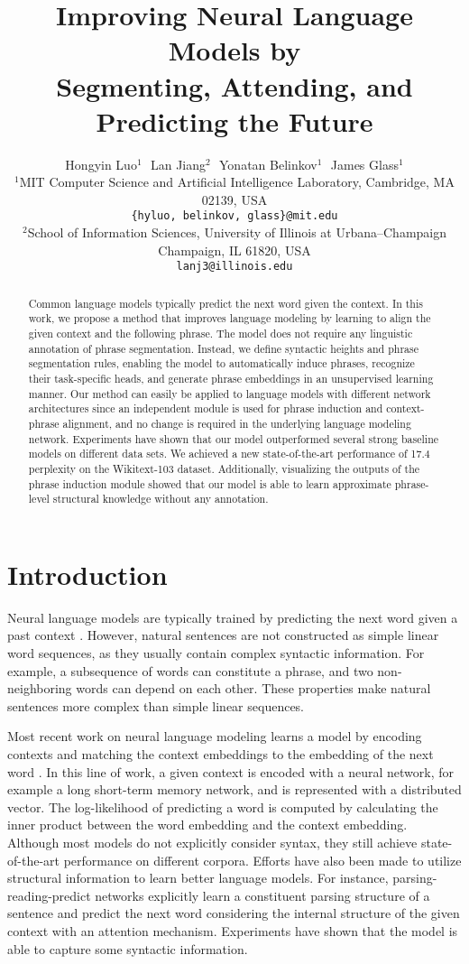 \documentclass[11pt,a4paper]{article}
\title{Improving Neural Language Models by\\ Segmenting, Attending, and Predicting the Future}
\author{Hongyin Luo$^1$ $    $ Lan Jiang$^2$ $    $ Yonatan Belinkov$^1$ $    $ James Glass$^1$ \\
  $^{1}$MIT Computer Science and Artificial Intelligence Laboratory, Cambridge, MA 02139, USA \\
  {\tt \{hyluo, belinkov, glass\}@mit.edu}\\
  $^{2}$School of Information Sciences, University of Illinois at Urbana--Champaign\\ Champaign, IL
61820, USA \\ 
  {\tt lanj3@illinois.edu}
  }
\date{}
\begin{document}
\maketitle
\begin{abstract}
Common language models typically predict the next word given the context. In this work, we propose a method that improves language modeling by learning to align the given context and the following phrase. The model does not require any linguistic annotation of phrase segmentation. Instead, we define syntactic heights and phrase segmentation rules, enabling the model to automatically induce phrases, recognize their task-specific heads, and generate phrase embeddings in an unsupervised learning manner. Our method can easily be applied to language models with different network architectures since an independent module is used for phrase induction and context-phrase alignment, and no change is required in the underlying language modeling network. Experiments have shown that our model outperformed several strong baseline models on different data sets. We achieved a new state-of-the-art performance of 17.4 perplexity on the Wikitext-103 dataset. Additionally, visualizing the outputs of the phrase induction module showed that our model is able to learn approximate phrase-level structural knowledge without any annotation.
\end{abstract}

\section{Introduction}

Neural language models
are typically trained
by predicting the next word given a past context \cite{bengio2003neural}. However, natural sentences are not constructed as simple linear word sequences, as they usually contain complex syntactic information. For example, a subsequence of words can constitute a phrase, and two non-neighboring words can depend on each other. These properties make natural sentences more complex than simple linear sequences.

Most recent work on neural language modeling learns a model by encoding contexts and matching the context embeddings to the embedding of the next word \cite{bengio2003neural,merity2017regularizing,melis2017state}. In this line of work, a given context is encoded with a neural network, for example a long short-term memory \citep[LSTM;][]{hochreiter1997long} network, and is represented with a distributed vector. The log-likelihood of predicting a word is computed by calculating the inner product between the word embedding and the context embedding. Although most models do not explicitly consider syntax, they still achieve state-of-the-art performance on different corpora. Efforts have also been made to utilize structural information to learn better language models. For instance, parsing-reading-predict networks \citep[PRPN;][]{shen2017neural} explicitly learn a constituent parsing structure of a sentence and predict the next word considering the internal structure of the given context with an attention mechanism. Experiments have shown that the model is able to capture some syntactic information.
\end{document}
